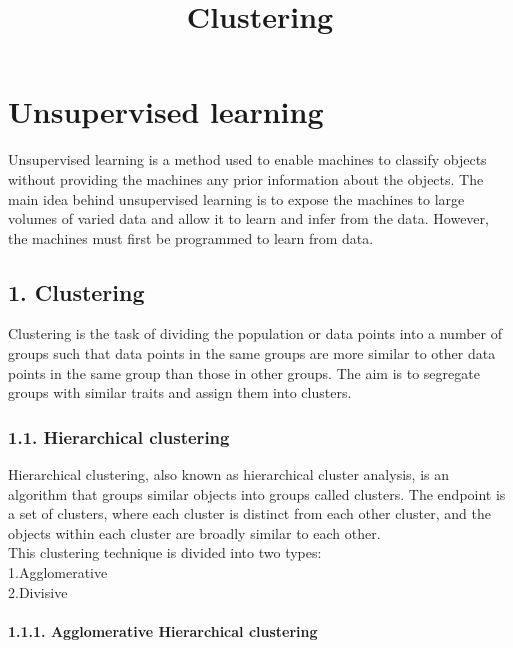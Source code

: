 \documentclass[11pt]{article}
\title{Clustering}
\begin{document}
    
    
    \maketitle
    
    

    
    \hypertarget{unsupervised-learning}{%
\section{Unsupervised learning}\label{unsupervised-learning}}

    Unsupervised learning is a method used to enable machines to classify
objects without providing the machines any prior information about the
objects. The main idea behind unsupervised learning is to expose the
machines to large volumes of varied data and allow it to learn and infer
from the data. However, the machines must first be programmed to learn
from data.

    \hypertarget{clustering}{%
\subsection{1. Clustering}\label{clustering}}

    Clustering is the task of dividing the population or data points into a
number of groups such that data points in the same groups are more
similar to other data points in the same group than those in other
groups. The aim is to segregate groups with similar traits and assign
them into clusters.

    \hypertarget{hierarchical-clustering}{%
\subsubsection{1.1. Hierarchical
clustering}\label{hierarchical-clustering}}

    Hierarchical clustering, also known as hierarchical cluster analysis, is
an algorithm that groups similar objects into groups called clusters.
The endpoint is a set of clusters, where each cluster is distinct from
each other cluster, and the objects within each cluster are broadly
similar to each other.\\
This clustering technique is divided into two types:\\
1.Agglomerative\\
2.Divisive

    \hypertarget{agglomerative-hierarchical-clustering}{%
\paragraph{1.1.1. Agglomerative Hierarchical
clustering}\label{agglomerative-hierarchical-clustering}}
\end{document}
